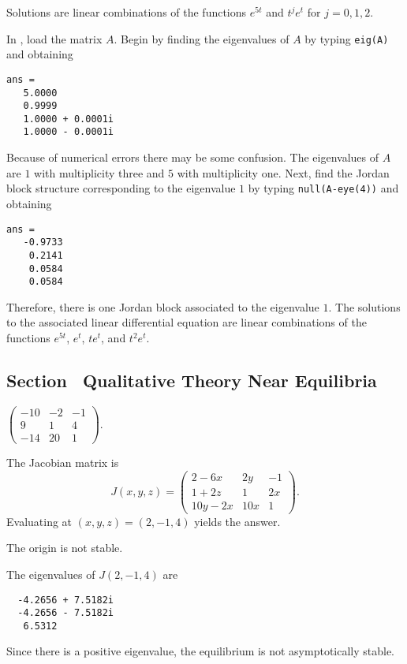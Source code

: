 \documentclass{ximera}
\begin{document}
 \ans Solutions are linear combinations of the functions 
$e^{5t}$ and $t^je^t$ for $j=0,1,2$.

\soln In \Matlabp, load the matrix $A$.  Begin by 
finding the eigenvalues of $A$ by typing {\tt eig(A)} and obtaining
\begin{verbatim}
ans =
   5.0000          
   0.9999          
   1.0000 + 0.0001i
   1.0000 - 0.0001i
\end{verbatim}
Because of numerical errors there may be some confusion.  The eigenvalues of
$A$ are $1$ with multiplicity three and $5$ with multiplicity one.  Next,
find the Jordan block structure corresponding to the eigenvalue $1$ by typing
{\tt null(A-eye(4))} and obtaining
\begin{verbatim}
ans =
   -0.9733
    0.2141
    0.0584
    0.0584
\end{verbatim}
Therefore, there is one Jordan block associated to the eigenvalue $1$.  The
solutions to the associated linear differential equation are linear
combinations of the functions $e^{5t}$, $e^t$, $te^t$, and $t^2e^t$.



\subsection*{Section~\protect{\ref{S:QT}} Qualitative Theory Near Equilibria}


 \ans $\left(\begin{array}{rrr}
-10 & -2 & -1\\ 9 & 1 & 4 \\ -14 & 20 & 1\end{array}\right)$.

\vspace{0.08in}

\soln  The Jacobian matrix is
\[
J(x,y,z) = \left(\begin{array}{ccc}
2 - 6x & 2y & -1\\ 1+2z & 1 & 2x\\ 10y-2x & 10x & 1\end{array}\right).
\]
Evaluating at $(x,y,z)=(2,-1,4)$ yields the answer.

 \ans The origin is not stable.

\soln The eigenvalues of $J(2,-1,4)$ are
\begin{verbatim}
  -4.2656 + 7.5182i
  -4.2656 - 7.5182i
   6.5312          
\end{verbatim}
Since there is a positive eigenvalue, the equilibrium is not 
asymptotically stable.
\end{document}
